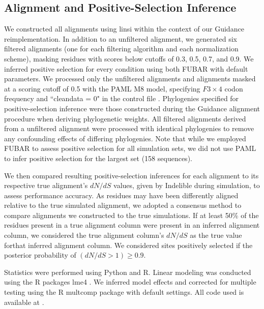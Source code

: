 \documentclass[10pt]{article}
\begin{document}
\subsection*{Alignment and Positive-Selection Inference}
We constructed all alignments using linsi \citep{Katoh2002,Katoh2005} within the context of our Guidance reimplementation. In addition to an unfiltered alignment, we generated six filtered alignments (one for each filtering algorithm and each normalization scheme), masking residues with scores below cutoffs of 0.3, 0.5, 0.7, and 0.9. We inferred positive selection for every condition using both FUBAR \citep{Murrell2013} with default parameters. We processed only the unfiltered alignments and alignments masked at a scoring cutoff of 0.5 with the PAML M8 model, specifying $F3\times4$ codon frequency and ``cleandata = 0" in the control file \citep{Yang2007}. Phylogenies specified for positive-selection inference were those constructed during the Guidance alignment procedure when deriving phylogenetic weights. All filtered alignments derived from a unfiltered alignment were processed with identical phylogenies to remove any confounding effects of differing phylogenies. Note that while we employed FUBAR to assess positive selection for all simulation sets, we did not use PAML to infer positive selection for the largest set (158 sequences).

We then compared resulting positive-selection inferences for each alignment to its respective true alignment's $dN/dS$ values, given by Indelible during simulation, to assess performance accuracy. As residues may have been differently aligned relative to the true simulated alignment, we adopted a consensus method to compare alignments we constructed to the true simulations. If at least 50\% of the residues present in a true alignment column were present in an inferred alignment column, we considered the true alignment column's $dN/dS$ as the true value forthat inferred alignment column. We considered sites positively selected if the posterior probability of $(dN/dS>1) \geq 0.9$.

Statistics were performed using Python and R. Linear modeling was conducted using the R packages lme4 \citep{Bates2012}. We inferred model effects and corrected for multiple testing using the R multcomp package \citep{Hothorn2008} with default settings. All code used is available at .
\end{document}
